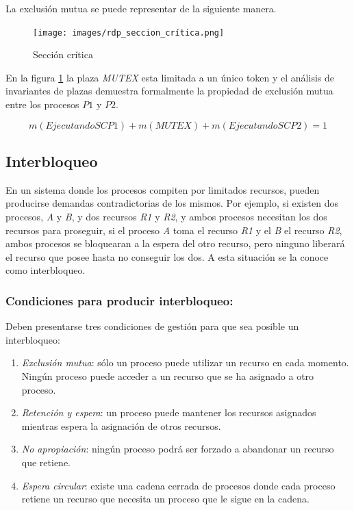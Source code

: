 \noindent La exclusión mutua se puede representar de la siguiente manera.
\begin{figure}[H]
    \centering
    \texttt{[image: images/rdp\_seccion\_crítica.png]}
    \caption{Sección crítica}
    \label{fig:rdp_seccion_crítica}
  \end{figure}

En la figura \ref{fig:rdp_seccion_crítica} la plaza \textit{MUTEX} esta limitada a un único token y el análisis de invariantes de plazas demuestra formalmente la propiedad de exclusión mutua entre los procesos $P1$ y $P2$. 

\begin{equation}
    m(EjecutandoSCP1) + m(MUTEX) + m(EjecutandoSCP2) = 1
\end{equation}

\subsection{Interbloqueo}
En un sistema donde los procesos compiten por limitados recursos, pueden producirse demandas contradictorias de los mismos. Por ejemplo, si existen dos procesos, \textit{A} y \textit{B}, y dos recursos \textit{R1} y \textit{R2}, y ambos procesos necesitan los dos recursos para proseguir, si el proceso \textit{A} toma el recurso \textit{R1} y el \textit{B} el recurso \textit{R2}, ambos procesos se bloquearan a la espera del otro recurso, pero ninguno liberará el recurso que posee hasta no conseguir los dos. A esta situación se la conoce como interbloqueo. 

\subsubsection{Condiciones para producir interbloqueo: }
\noindent Deben presentarse tres condiciones de gestión para que sea posible un interbloqueo:
\begin{enumerate}
    \item \textit{Exclusión mutua}: sólo un proceso puede utilizar un recurso en cada momento. Ningún proceso puede acceder a un recurso que se ha asignado a otro proceso.
    
    \item \textit{Retención y espera}: un proceso puede mantener los recursos asignados mientras espera la asignación de otros recursos.
    
    \item \textit{No apropiación}: ningún proceso podrá ser forzado a abandonar un recurso que retiene.
    
    \item \textit{Espera circular}: existe una cadena cerrada de procesos donde cada proceso retiene un recurso que necesita un proceso que le sigue en la cadena.
\end{enumerate}

